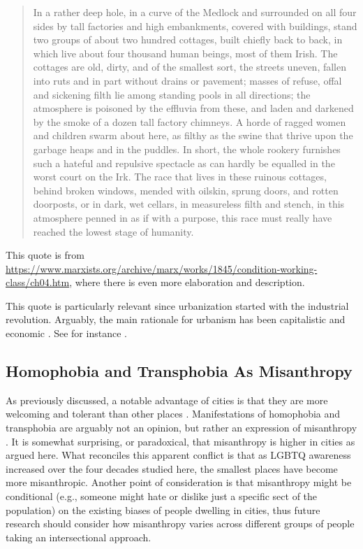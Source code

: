 \documentclass[11pt, letterpaper]{article}
\begin{document}
\begin{spacing}{1.4}
\begin{quote}
  In a rather deep hole, in a curve of the Medlock and surrounded on all four
  sides by tall factories and high embankments, covered with buildings, stand
  two groups of about two hundred cottages, built chiefly back to back, in which
  live about four thousand human beings, most of them Irish. The cottages are
  old, dirty, and of the smallest sort, the streets uneven, fallen into ruts and
  in part without drains or pavement; masses of refuse, offal and sickening
  filth lie among standing pools in all directions; the atmosphere is poisoned
  by the effluvia from these, and laden and darkened by the smoke of a dozen
  tall factory chimneys. A horde of ragged women and children swarm about here,
  as filthy as the swine that thrive upon the garbage heaps and in the
  puddles. In short, the whole rookery furnishes such a hateful and repulsive
  spectacle as can hardly be equalled in the worst court on the Irk. The race
  that lives in these ruinous cottages, behind broken windows, mended with
  oilskin, sprung doors, and rotten doorposts, or in dark, wet cellars, in
  measureless filth and stench, in this atmosphere penned in as if with a
  purpose, this race must really have reached the lowest stage of humanity.
\end{quote}

This quote is from
 \url{https://www.marxists.org/archive/marx/works/1845/condition-working-class/ch04.htm},
 where there is even more elaboration and description.
  
This quote is particularly relevant since urbanization started with the industrial revolution. Arguably, the main rationale for urbanism has been capitalistic and economic \citep{osullivan09,glaeser11}. See for instance \citet{harvey12,aokCityBook15,molotch76}.

\subsection{Homophobia and Transphobia As Misanthropy}

As previously discussed, a notable advantage of cities is that they are more welcoming and tolerant than other places \citep{park84,tuch87,wirth38,stephan82,aok20}. Manifestations of homophobia and transphobia are arguably not an opinion, but rather an expression of misanthropy \citep{lehmannMISC22jun6}. 
It is somewhat surprising, or paradoxical, that misanthropy is higher in cities as
argued here.  What reconciles this apparent conflict is that as LGBTQ awareness increased over the four decades studied here, the smallest places have become more misanthropic. Another point of consideration is that misanthropy might be conditional (e.g., someone might hate or dislike just a specific sect of the population) on the existing biases of people dwelling in cities, thus future research should consider how misanthropy varies across different groups of people taking an intersectional approach. 


\end{spacing}
\end{document}
